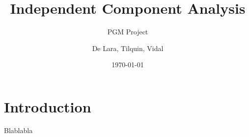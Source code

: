 \documentclass[a4paper]{article}
\title{Independent Component Analysis}
\subtitle{PGM Project}
\author{De Lara, Tilquin, Vidal}
\date{\today}
\begin{document}
 

\zztitre

\tableofcontents

\vspace{1cm}\zligne


\section{Introduction}

Blablabla




{}
\nocite{*}

\label{lastpage}
\end{document}
